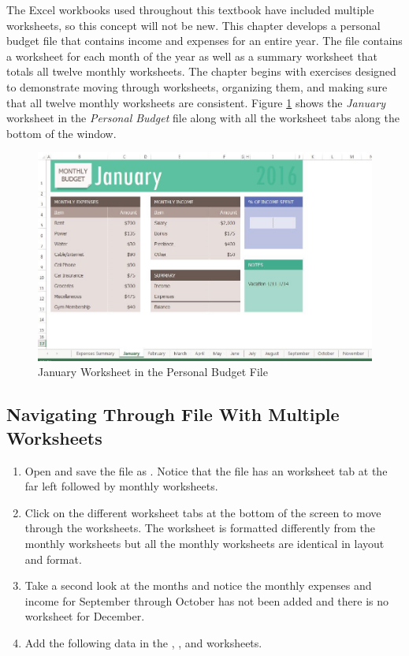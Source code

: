 The Excel workbooks used throughout this textbook have included multiple worksheets, so this concept will not be new. This chapter develops a personal budget file that contains income and expenses for an entire year. The file contains a worksheet for each month of the year as well as a summary worksheet that totals all twelve monthly worksheets. The chapter begins with exercises designed to demonstrate moving through worksheets, organizing them, and making sure that all twelve monthly worksheets are consistent. Figure \ref{06:fig01} shows the \textit{January} worksheet in the \textit{Personal Budget} file along with all the worksheet tabs along the bottom of the window.

\begin{figure}[H]
	\centering
	\includegraphics[width=\maxwidth{.95\linewidth}]{gfx/ch06_fig01}
	\caption{January Worksheet in the Personal Budget File}
	\label{06:fig01}
\end{figure}

\subsection{Navigating Through File With Multiple Worksheets}

\begin{enumerate}
	\item Open  and save the file as . Notice that the file has an  worksheet tab at the far left followed by monthly worksheets.
	\item Click on the different worksheet tabs at the bottom of the screen to move through the worksheets. The  worksheet is formatted differently from the monthly worksheets but all the monthly worksheets are identical in layout and format.
	\item Take a second look at the months and notice the monthly expenses and income for September through October has not been added and there is no worksheet for December. 
	\item Add the following data in the , , and  worksheets.
\end{enumerate}

